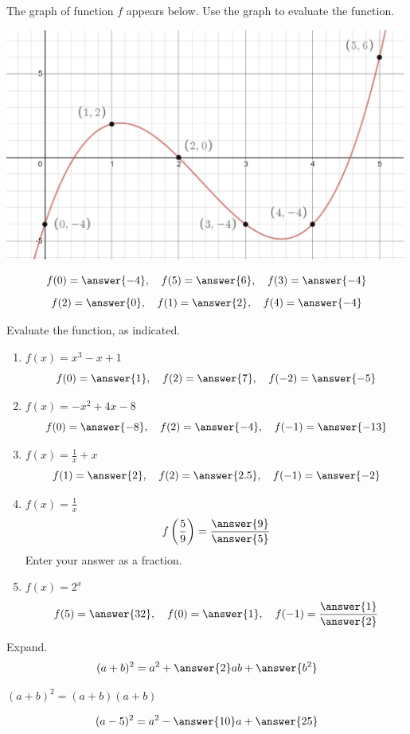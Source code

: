 \documentclass{ximera}
\begin{document}
\begin{problem}\label{prob:160hom1prob4}
The graph of function $f$ appears below.  Use the graph to evaluate the function.
\begin{image}
   \includegraphics[height=3in]{160H1pic6.jpg}
 \end{image}
 $$f(0)=\answer{-4},\quad f(5)=\answer{6},\quad f(3)=\answer{-4}$$ $$f(2)=\answer{0},\quad f(1)=\answer{2},\quad f(4)=\answer{-4}$$
\end{problem}

\begin{problem}\label{prob:160hom1prob5}
Evaluate the function, as indicated.
\begin{enumerate}
    \item $f(x)=x^3-x+1$ $$f(0)=\answer{1},\quad f(2)=\answer{7},\quad f(-2)=\answer{-5}$$
    \item $f(x)=-x^2+4x-8$ $$f(0)=\answer{-8},\quad f(2)=\answer{-4},\quad f(-1)=\answer{-13}$$
    \item $f(x)=\frac{1}{x}+x$ $$f(1)=\answer{2},\quad f(2)=\answer{2.5},\quad f(-1)=\answer{-2}$$
    \item $f(x)=\frac{1}{x}$  $$f\left(\frac{5}{9}\right)=\frac{\answer{9}}{\answer{5}}$$
    Enter your answer as a fraction.
    \item $f(x)=2^x$ $$f(5)=\answer{32},\quad f(0)=\answer{1},\quad f(-1)=\frac{\answer{1}}{\answer{2}}$$
\end{enumerate}
\end{problem}

\begin{problem}\label{prob:160hom1prob9}
Expand.
$$(a+b)^2=a^2+\answer{2}ab+\answer{b^2}$$
\begin{hint}
$(a+b)^2=(a+b)(a+b)$
\end{hint}
$$(a-5)^2=a^2-\answer{10}a
+\answer{25}$$
\end{problem}
\end{document}
